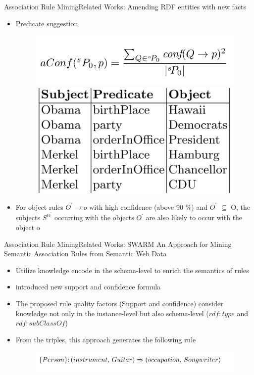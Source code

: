 \documentclass[10pt]{beamer}
\begin{document}
\begin{frame}{Association Rule Mining}{Related Works:  Amending RDF entities with new facts}
	\begin{itemize}
	\item Predicate suggestion
		\begin{figure} 
		 \includegraphics[width=.5\linewidth]{images/suggestion-formula.PNG}
			\includegraphics[width=.4\linewidth]{images/predicate-suggestion.PNG}
		\end{figure}
	\item For object rules $O^\prime \rightarrow o$ with high confidence (above 90 $\%$) and $O^\prime$ $ \subseteq$ O, the subjects  $S^{O^\prime} $	occurring with the objects $O^\prime$ are also likely to occur with the	object o

\end{itemize}
\end{frame}

\begin{frame}{Association Rule Mining}{Related Works:  SWARM}
An Approach for Mining Semantic Association Rules from Semantic Web Data \cite{barati2016swarm}
\begin{itemize}
\item Utilize knowledge encode in the schema-level to enrich the semantics of rules
\item introduced new support and confidence formula
\item The proposed rule quality factors (Support and confidence) consider knowledge not only in the instance-level but also schema-level ($rdf:type$ and $rdf:subClassOf$)
\item From the triples, this approach generates the following rule
	\begin{figure} 
		\centering
		\includegraphics[width=1\linewidth]{images/swarm-example.PNG}
		 
	\end{figure}
\end{itemize}
\end{frame}
	
\end{document}
